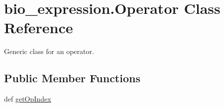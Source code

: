 \hypertarget{classbio__expression_1_1_operator}{\section{bio\+\_\+expression.\+Operator Class Reference}
\label{classbio__expression_1_1_operator}
}


Generic class for an operator.  


\subsection*{Public Member Functions}
\begin{DoxyCompactItemize}
\item 
def \hyperlink{classbio__expression_1_1_operator_a8541e72c91e88d2a7582a6d6490442a6}{get\+Op\+Index}
\end{DoxyCompactItemize}
